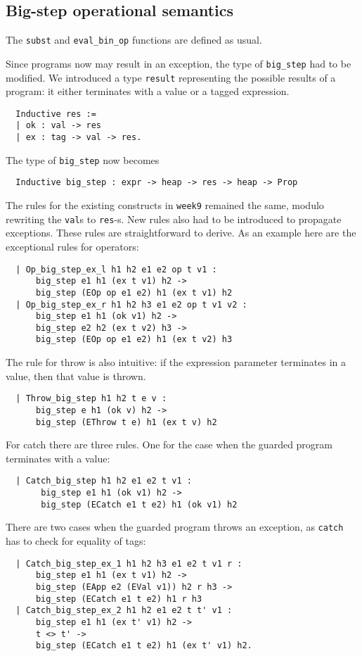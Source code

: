 \documentclass{article}
\begin{document}
\subsection{Big-step operational semantics}

The \texttt{subst} and \texttt{eval\_bin\_op} functions are defined as usual. 

Since programs now may result in an exception, the type of \texttt{big\_step} had to be modified. We introduced a type \texttt{result} representing the possible results of a program: it either terminates with a value or a tagged expression.
\begin{lstlisting}
  Inductive res :=
  | ok : val -> res
  | ex : tag -> val -> res.
\end{lstlisting}
The type of \texttt{big\_step} now becomes
\begin{lstlisting}
  Inductive big_step : expr -> heap -> res -> heap -> Prop
\end{lstlisting}
The rules for the existing constructs in \texttt{week9} remained the same, modulo rewriting the \texttt{val}s to \texttt{res}-s. New rules also had to be introduced to propagate exceptions. These rules are straightforward to derive. As an example here are the exceptional rules for operators:
\begin{lstlisting}
  | Op_big_step_ex_l h1 h2 e1 e2 op t v1 :
      big_step e1 h1 (ex t v1) h2 ->
      big_step (EOp op e1 e2) h1 (ex t v1) h2
  | Op_big_step_ex_r h1 h2 h3 e1 e2 op t v1 v2 :
      big_step e1 h1 (ok v1) h2 ->
      big_step e2 h2 (ex t v2) h3 ->
      big_step (EOp op e1 e2) h1 (ex t v2) h3
\end{lstlisting}

The rule for throw is also intuitive: if the expression parameter terminates in a value, then that value is thrown.
\begin{lstlisting}
  | Throw_big_step h1 h2 t e v :
      big_step e h1 (ok v) h2 ->
      big_step (EThrow t e) h1 (ex t v) h2
\end{lstlisting}
For catch there are three rules. One for the case when the guarded program terminates with a value:
\begin{lstlisting}
  | Catch_big_step h1 h2 e1 e2 t v1 :
       big_step e1 h1 (ok v1) h2 ->
       big_step (ECatch e1 t e2) h1 (ok v1) h2
\end{lstlisting}
There are two cases when the guarded program throws an exception, as \texttt{catch}  has to check for equality of tags:
\begin{lstlisting}
  | Catch_big_step_ex_1 h1 h2 h3 e1 e2 t v1 r :
      big_step e1 h1 (ex t v1) h2 ->
      big_step (EApp e2 (EVal v1)) h2 r h3 ->
      big_step (ECatch e1 t e2) h1 r h3
  | Catch_big_step_ex_2 h1 h2 e1 e2 t t' v1 :
      big_step e1 h1 (ex t' v1) h2 ->
      t <> t' ->
      big_step (ECatch e1 t e2) h1 (ex t' v1) h2.
\end{lstlisting}
\end{document}
